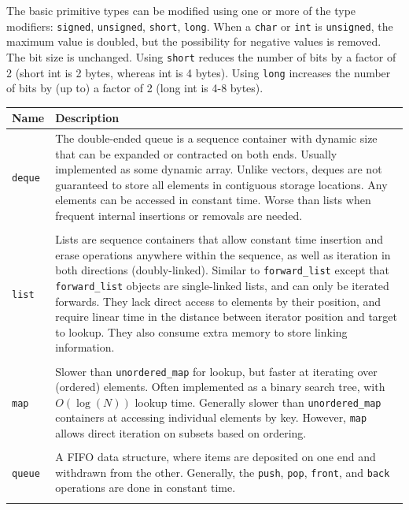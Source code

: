 The basic primitive types can be modified using one or more of the type modifiers: \texttt{signed}, \texttt{unsigned}, \texttt{short}, \texttt{long}. When a \texttt{char} or \texttt{int} is \texttt{unsigned}, the maximum value is doubled, but the possibility for negative values is removed. The bit size is unchanged. Using \texttt{short} reduces the number of bits by a factor of 2 (short int is 2 bytes, whereas int is 4 bytes). Using \texttt{long} increases the number of bits by (up to) a factor of 2 (long int is 4-8 bytes). 

\begin{tabular}{p{}p{}}
	Name & Description \\
	\hline
	\texttt{deque} & The double-ended queue is a sequence container with dynamic size that can be expanded or contracted on both ends. Usually implemented as some dynamic array. Unlike vectors, deques are not guaranteed to store all elements in contiguous storage locations. Any elements can be accessed in constant time. Worse than lists when frequent internal insertions or removals are needed. \\
	\hfill \\
	\texttt{list} & Lists are sequence containers that allow constant time insertion and erase operations anywhere within the sequence, as well as iteration in both directions (doubly-linked). Similar to \texttt{forward\_list} except that \texttt{forward\_list} objects are single-linked lists, and can only be iterated forwards. They lack direct access to elements by their position, and require linear time in the distance between iterator position and target to lookup. They also consume extra memory to store linking information. \\
	\hfill \\
	\texttt{map} & Slower than \texttt{unordered\_map} for lookup, but faster at iterating over (ordered) elements. Often implemented as a binary search tree, with $O(\log(N))$ lookup time. Generally slower than \texttt{unordered\_map} containers at accessing individual elements by key. However, \texttt{map} allows direct iteration on subsets based on ordering. \\
	\hfill \\
	\texttt{queue} & A FIFO data structure, where items are deposited on one end and withdrawn from the other. Generally, the \texttt{push}, \texttt{pop}, \texttt{front}, and \texttt{back} operations are done in constant time. \\
	\hfill \\

\end{tabular}
